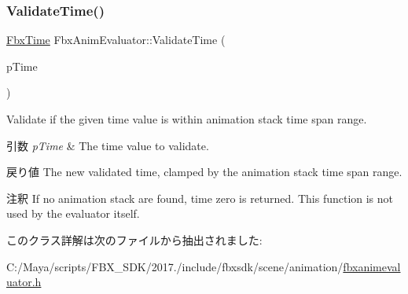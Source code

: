\subsubsection{\texorpdfstring{Validate\+Time()}{ValidateTime()}}
{\footnotesize\ttfamily \hyperlink{class_fbx_time}{Fbx\+Time} Fbx\+Anim\+Evaluator\+::\+Validate\+Time (\begin{DoxyParamCaption}\item[{const \hyperlink{class_fbx_time}{Fbx\+Time} \&}]{p\+Time }\end{DoxyParamCaption})}

Validate if the given time value is within animation stack time span range. 
\begin{DoxyParams}{引数}
{\em p\+Time} & The time value to validate. \\
\hline
\end{DoxyParams}
\begin{DoxyReturn}{戻り値}
The new validated time, clamped by the animation stack time span range. 
\end{DoxyReturn}
\begin{DoxyRemark}{注釈}
If no animation stack are found, time zero is returned. This function is not used by the evaluator itself. 
\end{DoxyRemark}


このクラス詳解は次のファイルから抽出されました\+:\begin{DoxyCompactItemize}
\item 
C\+:/\+Maya/scripts/\+F\+B\+X\+\_\+\+S\+D\+K/2017./include/fbxsdk/scene/animation/\hyperlink{fbxanimevaluator_8h}{fbxanimevaluator.\+h}\end{DoxyCompactItemize}
